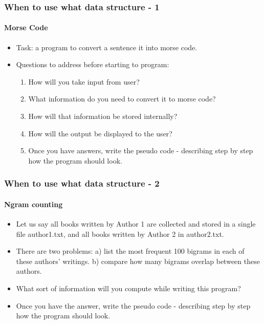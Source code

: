 \documentclass{beamer}
\begin{document}
\begin{frame}
\frametitle{When to use what data structure - 1}
\framesubtitle{Morse Code}
\begin{itemize}
\item Task: a program to convert a sentence it into morse code.
\item Questions to address before starting to program:
\begin{enumerate}
\item How will you take input from user?
\item What information do you need to convert it to morse code? 
\item How will that information be stored internally?
\item How will the output be displayed to the user?
\item Once you have answers, write the pseudo code - describing step by step how the program should look.
\end{enumerate}
\end{itemize}
\end{frame}

\begin{frame}
\frametitle{When to use what data structure - 2}
\framesubtitle{Ngram counting}
\begin{itemize}
\item Let us say all books written by Author 1 are collected and stored in a single file author1.txt, and all books written by Author 2 in author2.txt.
\item There are two problems: a) list the most frequent 100 bigrams in each of these authors' writings. b) compare how many bigrams overlap between these authors.
\item What sort of information will you compute while writing this program?
\item Once you have the answer, write the pseudo code - describing step by step how the program should look.
\end{itemize}
\end{frame}
\end{document}
